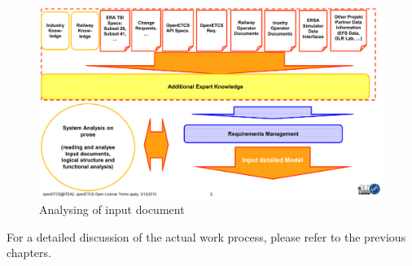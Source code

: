 \begin{figure}[h]
\includegraphics[scale=0.5]{images/AnalysisDocuments}
\caption{Analysing of input document}
\label{Analyising of input document}
\end{figure}

For a detailed discussion of the actual work process, please refer to the previous chapters. 

